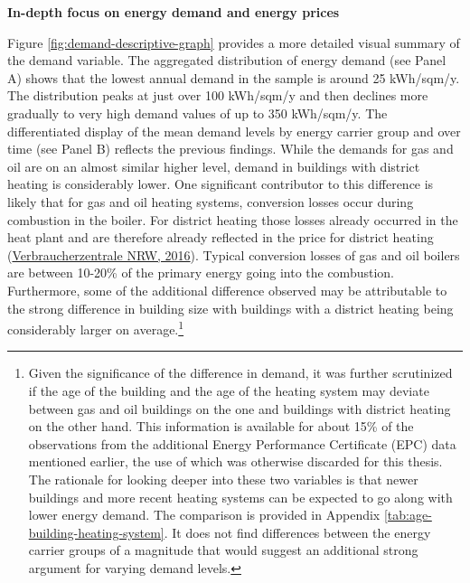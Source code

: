 \documentclass[12pt,twoside]{reedthesis}
\begin{document}
\textbf{In-depth focus on energy demand and energy prices}

Figure \ref{fig:demand-descriptive-graph} provides a more detailed visual summary of the demand variable. The aggregated distribution of energy demand (see Panel A) shows that the lowest annual demand in the sample is around 25 kWh/sqm/y. The distribution peaks at just over 100 kWh/sqm/y and then declines more gradually to very high demand values of up to 350 kWh/sqm/y. The differentiated display of the mean demand levels by energy carrier group and over time (see Panel B) reflects the previous findings. While the demands for gas and oil are on an almost similar higher level, demand in buildings with district heating is considerably lower. One significant contributor to this difference is likely that for gas and oil heating systems, conversion losses occur during combustion in the boiler. For district heating those losses already occurred in the heat plant and are therefore already reflected in the price for district heating (\protect\hyperlink{ref-verbraucherzentralenrw16}{Verbraucherzentrale NRW, 2016}). Typical conversion losses of gas and oil boilers are between 10-20\% of the primary energy going into the combustion. Furthermore, some of the additional difference observed may be attributable to the strong difference in building size with buildings with a district heating being considerably larger on average.\footnote{Given the significance of the difference in demand, it was further scrutinized if the age of the building and the age of the heating system may deviate between gas and oil buildings on the one and buildings with district heating on the other hand. This information is available for about 15\% of the observations from the additional Energy Performance Certificate (EPC) data mentioned earlier, the use of which was otherwise discarded for this thesis. The rationale for looking deeper into these two variables is that newer buildings and more recent heating systems can be expected to go along with lower energy demand. The comparison is provided in Appendix \ref{tab:age-building-heating-system}. It does not find differences between the energy carrier groups of a magnitude that would suggest an additional strong argument for varying demand levels.}
\end{document}
